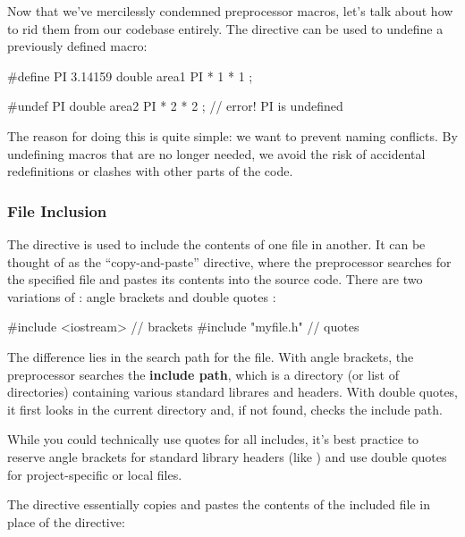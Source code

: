 \documentclass[12pt]{article}
\begin{document}
\noindent
Now that we've mercilessly condemned preprocessor macros, let's talk about how to rid them from our codebase entirely.
The  directive can be used to undefine a previously defined macro:

\begin{cxx}{}
#define PI 3.14159
double area1 { PI * 1 * 1 };

#undef PI
double area2 { PI * 2 * 2 }; // error! PI is undefined
\end{cxx}

\noindent
The reason for doing this is quite simple: we want to prevent naming conflicts.
By undefining macros that are no longer needed, we avoid the risk of accidental redefinitions or clashes with other parts of the code.

\subsubsection{File Inclusion }
\label{sec:file-inclusion}

\noindent
The  directive is used to include the contents of one file in another.
It can be thought of as the ``copy-and-paste'' directive, where the preprocessor searches for the specified file and pastes its contents into the source code.
There are two variations of : angle brackets \inlinecxx{<>} and double quotes :

\begin{cxx}{}
#include <iostream> // brackets
#include "myfile.h" // quotes
\end{cxx}

\noindent
The difference lies in the search path for the file.
With angle brackets, the preprocessor searches the \textbf{include path}, which is a directory (or list of directories) containing various standard librares and headers.
With double quotes, it first looks in the current directory and, if not found, checks the include path.

\begin{advice}
While you could technically use quotes for all includes, it's best practice to reserve angle brackets for standard library headers (like ) and use double quotes for project-specific or local files.
\end{advice}

\noindent
The  directive essentially copies and pastes the contents of the included file in place of the directive:
\end{document}
